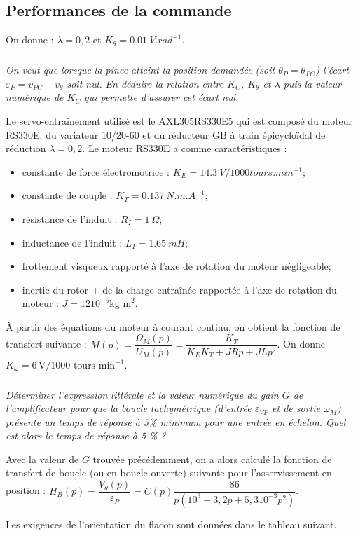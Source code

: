 \documentclass[10pt,fleqn]{article} %
\begin{document}
\begin{multicols}{2}
\section*{Performances de la commande}
On donne : $\lambda=0,2$ et $K_{\theta}=\SI{0,01}{V.rad^{-1}}$.

\subparagraph{}\textit{On veut que lorsque la pince atteint la position demandée (soit $\theta_P = \theta_{PC}$) l'écart $\varepsilon_P=v_{PC}-v_{\theta}$ soit nul. En déduire la relation entre $K_C$, $K_{\theta}$ et $\lambda$ puis la valeur numérique de $K_C$ qui permette d'assurer cet écart nul.}

Le servo-entraînement utilisé est le AXL305RS330E5 qui est composé du moteur RS330E, du variateur 10/20-60 et du réducteur GB à train épicycloïdal de réduction $\lambda = 0,2$. 
Le moteur RS330E a comme caractéristiques :
\begin{itemize}
\item constante de force électromotrice : $K_E = \SI{14,3}{V/1000 tours.min^{-1}}$;
\item constante de couple : $K_T = \SI{0,137}{N.m.A^{-1}}$;
\item résistance de l’induit : $R_I =\SI{1}{\Omega}$;
\item inductance de l’induit : $L_I = \SI{1,65}{mH}$;
\item frottement visqueux rapporté à l’axe de rotation du moteur négligeable;
\item inertie du rotor + de la charge entraînée rapportée à l’axe de rotation du moteur : $J = 12 10^{-5} \text{kg m}^2$.
\end{itemize}

À partir des équations du moteur à courant continu, on obtient la fonction de transfert suivante : 
$M(p)=\dfrac{\Omega_M(p)}{U_M(p)}=\dfrac{K_T}{K_EK_T +JRp + JLp^2}$. On donne $K_{\omega}=6\,\text{V}/1000 \text{ tours min}^{-1}$.

\subparagraph{}\textit{Déterminer l’expression littérale et la valeur numérique du gain $G$ de l’amplificateur pour que la boucle tachymétrique (d’entrée $\varepsilon_{VP}$ et de sortie $\omega_M$) présente un temps de réponse à 5\% minimum pour une entrée en échelon. Quel est alors le temps de réponse à 5 \% ?}


Avec la valeur de $G$ trouvée précédemment, on a alors calculé la fonction de transfert de boucle (ou en boucle ouverte) suivante pour l’asservissement en position :
$H_B(p)=\dfrac{V_{\theta}(p)}{\varepsilon_P}=C(p)\dfrac{86}{p\left(10^3+3,2 p + 5,3 10^{-3}p^2 \right)}$.


Les exigences de l'orientation du flacon sont données dans le tableau suivant. 
\begin{center}
\begin{tabular}{ccc}
\end{tabular}
\end{center}
\end{multicols}
\end{document}
